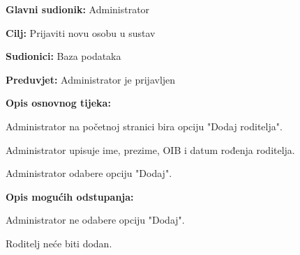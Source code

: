 					
					\noindent {}
					\begin{packed_item}
						
						\item \textbf{Glavni sudionik: }Administrator
						\item  \textbf{Cilj:} Prijaviti novu osobu u sustav
						\item  \textbf{Sudionici:} Baza podataka
						\item  \textbf{Preduvjet:} Administrator je prijavljen
						\item  \textbf{Opis osnovnog tijeka:}
						
						\item[] \begin{packed_enum}
							
							\item Administrator na početnoj stranici bira opciju "Dodaj roditelja".
							\item Administrator upisuje ime, prezime, OIB i datum rođenja roditelja.
							\item Administrator odabere opciju "Dodaj".
						\end{packed_enum}
						
						\item  \textbf{Opis mogućih odstupanja:}
						
						\item[] \begin{packed_item}
							
							\item[3.a] Administrator ne odabere opciju "Dodaj".
							\item[] \begin{packed_enum}
								
								\item Roditelj neće biti dodan.
							\end{packed_enum}
							
							
						\end{packed_item}
						
						
					\end{packed_item}
					
